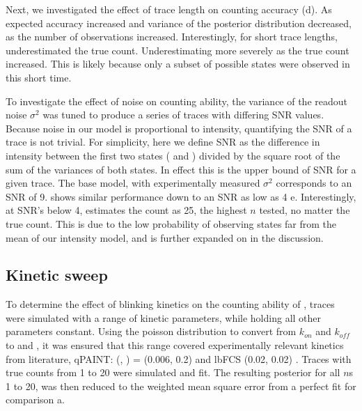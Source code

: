 Next, we investigated the effect of trace length on counting accuracy (d).
	As expected accuracy increased and variance of the posterior distribution decreased, 
	as the number of observations increased.
	Interestingly, for short trace lengths, \ours underestimated the true count. 
	Underestimating more severely as the true count increased.
	This is likely because only a subset of possible states were observed in this short time.

To investigate the effect of noise on counting ability, the variance of the readout noise $\sigma^{2}$ was tuned to produce a 
	series of traces with differing SNR values. 
	Because noise in our model is proportional to intensity, quantifying the SNR of a trace 
	is not trivial. 
	For simplicity, here we define SNR as the difference in intensity between 
	the first two states ( and ) divided by the square root of the sum of the variances of both states. 
	In effect this is the upper bound of SNR for a given trace. 
	The base model, with experimentally measured $\sigma^{2}$ corresponds to an SNR of 9. 
	\ours shows similar performance down to an SNR as low as 4 e. 
	Interestingly, at SNR's below 4, \ours estimates the count as 25, the highest $n$ tested, no matter the true count. 
	This is due to the low probability of observing states far from the mean of our intensity model, and is further expanded on in the discussion. 


\subsection{Kinetic sweep}
To determine the effect of blinking kinetics on the counting ability of \ours, traces were simulated with a range of kinetic parameters, 
	while holding all other parameters constant.
	Using the poisson distribution to convert from $k_{on}$ and $k_{off}$ to \pon and \poff,
	it was ensured that this range covered experimentally relevant kinetics from literature,
	qPAINT: (\pon, \poff) = (0.006, 0.2) \cite{jungmann_2016} and lbFCS (0.02, 0.02) \cite{stein_2021}. 
	Traces with true counts from 1 to 20 were simulated and fit.
	The resulting posterior for all $n$s 1 to 20, was then reduced to the weighted mean square error from a perfect fit for comparison a.
	
